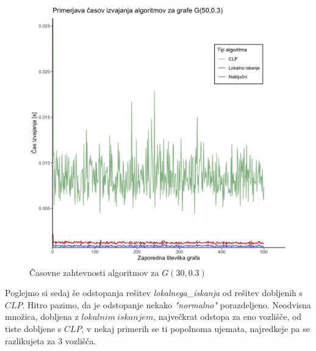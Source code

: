 \documentclass[a4paper, 12pt]{article}
\begin{document}
\begin{figure}[h!]
	\begin{center}
		\includegraphics[scale=0.11]{R_koda/pon-casi.png}
		\caption{Časovne zahtevnosti algoritmov za $G(30, 0.3)$}
	\end{center}
\end{figure}

\noindent Poglejmo si sedaj še odstopanja rešitev \textit{lokalnega\_iskanja} od rešitev dobljenih s $CLP$. Hitro pazimo, da je odstopanje nekako \textit{"normalno"} porazdeljeno. Neodvisna množica, dobljena z  $lokalnim\ iskanjem$, največkrat odstopa za eno vozlišče, od tiste dobljene s $CLP$, 
v nekaj primerih se ti popolnoma ujemata, najredkeje pa se razlikujeta za 3 vozlišča.
\end{document}
